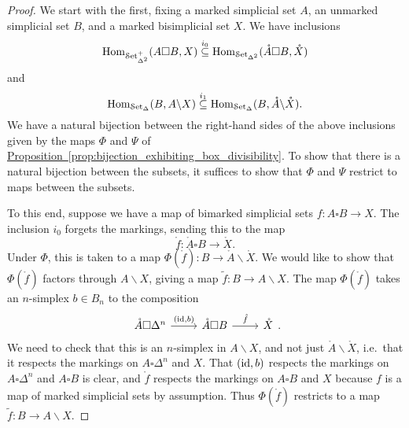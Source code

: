 \documentclass[main.tex]{subfiles}
\begin{document}
\begin{proof}
  We start with the first, fixing a marked simplicial set $A$, an unmarked simplicial set $B$, and a marked bisimplicial set $X$. We have inclusions
  \begin{equation*}
    \mathrm{Hom}_{\mathcal{S}\mathrm{et}_{\Delta^{2}}^{+}}(A \square B, X) \overset{i_{0}}{\subseteq} \mathrm{Hom}_{\mathcal{S}\mathrm{et}_{\Delta^{2}}}(\mathring{A} \square B, \mathring{X})
  \end{equation*}
  and
  \begin{equation*}
    \mathrm{Hom}_{\mathcal{S}\mathrm{et}_{\Delta}}(B, A \backslash X) \overset{i_{1}}{\subseteq} \mathrm{Hom}_{\mathcal{S}\mathrm{et}_{\Delta}}(B, \mathring{A} \backslash \mathring{X}).
  \end{equation*}
  We have a natural bijection between the right-hand sides of the above inclusions given by the maps $\Phi$ and $\Psi$ of \hyperref[prop:bijection_exhibiting_box_divisibility]{Proposition~\ref*{prop:bijection_exhibiting_box_divisibility}}. To show that there is a natural bijection between the subsets, it suffices to show that $\Phi$ and $\Psi$ restrict to maps between the subsets.

  To this end, suppose we have a map of bimarked simplicial sets $f\colon A \square B \to X$. The inclusion $i_{0}$ forgets the markings, sending this to the map
  \begin{equation*}
    \mathring{f}\colon \mathring{A} \square B \to \mathring{X}.
  \end{equation*}
  Under $\Phi$, this is taken to a map $\Phi(\mathring{f}) \colon B \to \mathring{A} \backslash \mathring{X}$. We would like to show that $\Phi(\mathring{f})$ factors through $A \backslash X$, giving a map $\tilde{f}\colon B \to A \backslash X$. The map $\Phi(\mathring{f})$ takes an $n$-simplex $b \in B_{n}$ to the composition
  \begin{equation*}
    \begin{tikzcd}
      \mathring{A} \square \Delta^{n}
      \arrow[r, "{(\id, b)}"]
      & \mathring{A} \square B
      \arrow[r, "\mathring{f}"]
      & \mathring{X}
    \end{tikzcd}.
  \end{equation*}
  We need to check that this is an $n$-simplex in $A \backslash X$, and not just $\mathring{A} \backslash \mathring{X}$, i.e.\ that it respects the markings on $A \square \Delta^{n}$ and $X$. That $(\mathrm{id}, b)$ respects the markings on $A \square \Delta^{n}$ and $A \square B$ is clear, and $\mathring{f}$ respects the markings on $A \square B$ and $X$ because $f$ is a map of marked simplicial sets by assumption. Thus $\Phi(\mathring{f})$ restricts to a map $\tilde{f}\colon B \to A \backslash X$.


\end{proof}
\end{document}
